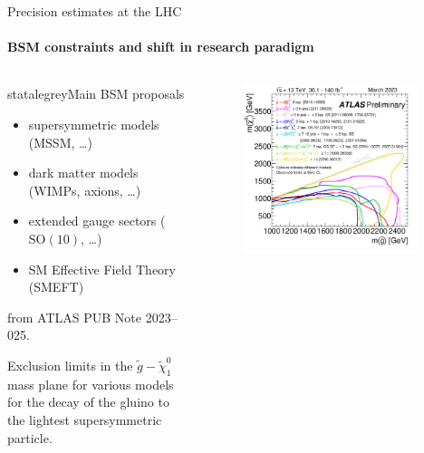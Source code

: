 
\begin{frame}{Precision estimates at the LHC}
  \framesubtitle{BSM constraints and shift in research paradigm}

  \begin{columns}

    \begin{column}{0.5 \textwidth}

      \begin{colorblock}[black]{statalegrey}{Main BSM proposals}
        \begin{itemize}
          \item supersymmetric models (MSSM, \dots)
          \item dark matter models (WIMPs, axions, \dots)
          \item extended gauge sectors ($ \mathrm{SO}(10) $, \dots)
          \item SM Effective Field Theory (SMEFT)
        \end{itemize}
      \end{colorblock}

      \vspace{0.5em}

       from ATLAS PUB Note 2023--025.

      \justifying
      Exclusion limits in the $ \tilde{g} - \tilde{\chi}^0_1 $ mass plane for various models for the decay of the gluino to the lightest supersymmetric particle.

    \end{column}

    \begin{column}{0.5\textwidth}

      \begin{figure}
        \centering
        \includegraphics[width = 0.94\textwidth]{imgs/susy.png}
      \end{figure}


\end{column}
\end{columns}
\end{frame}
